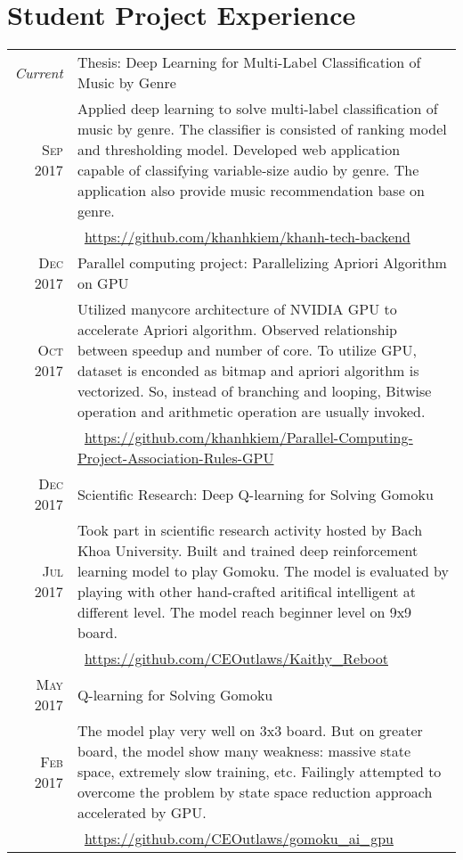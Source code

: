 \documentclass[a4paper,10pt]{article}
\begin{document}
\section{Student Project Experience}
\begin{tabular}{r|p{12cm}}
	\emph{Current} & Thesis: Deep Learning for Multi-Label Classification of Music by Genre\\ 
	\textsc{Sep 2017} & \footnotesize{Applied deep learning to solve multi-label classification of music by genre. The classifier is consisted of ranking model and thresholding model. Developed web application capable of classifying variable-size audio by genre. The application also provide music recommendation base on genre.} \\
	& \footnotesize{\faExternalLink\, \href{https://github.com/khanhkiem/khanh-tech-backend}{https://github.com/khanhkiem/khanh-tech-backend}}\\	
	\textsc{Dec 2017} & Parallel computing project: Parallelizing Apriori Algorithm on GPU\\
	\textsc{Oct 2017} & \footnotesize{Utilized manycore architecture of NVIDIA GPU to accelerate Apriori algorithm. Observed relationship between speedup and number of core. To utilize GPU, dataset is enconded as bitmap and apriori algorithm is vectorized. So, instead of branching and looping, Bitwise operation and arithmetic operation are usually invoked.}	\\
	& \footnotesize{\faExternalLink\, \href{https://github.com/khanhkiem/Parallel-Computing-Project-Association-Rules-GPU}{https://github.com/khanhkiem/Parallel-Computing-Project-Association-Rules-GPU}}\\
	\textsc{Dec 2017} & Scientific Research: Deep Q-learning for Solving Gomoku \\
	\textsc{Jul 2017} & \footnotesize{Took part in scientific research activity hosted by Bach Khoa University. Built and trained deep reinforcement learning model to play Gomoku. The model is evaluated by playing with other hand-crafted aritifical intelligent at different level. The model reach beginner level on 9x9 board.} \\
	& \footnotesize{\faExternalLink\, \href{https://github.com/CEOutlaws/Kaithy_Reboot}{https://github.com/CEOutlaws/Kaithy\_Reboot}}\\
	\textsc{May 2017} & Q-learning for Solving Gomoku \\
	\textsc{Feb 2017} & \footnotesize{The model play very well on 3x3 board. But on greater board, the model show many weakness: massive state space, extremely slow training, etc. Failingly attempted to overcome the problem by state space reduction approach accelerated by GPU.} \\
	& \footnotesize{\faExternalLink\, \href{https://github.com/CEOutlaws/gomoku_ai_gpu}{https://github.com/CEOutlaws/gomoku\_ai\_gpu}}\\	
\end{tabular}
\end{document}
